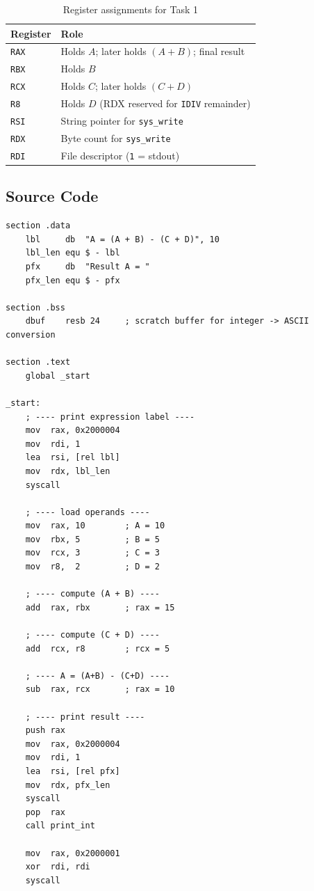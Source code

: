 \documentclass[12pt,a4paper]{article}
\newcommand{\code}[1]{\texttt{\small #1}}
\begin{document}
\begin{table}[H]
  \centering
  \caption{Register assignments for Task 1}
  \renewcommand{\arraystretch}{1.3}
  \begin{tabular}{|l|l|}
    \hline
    \textbf{Register} & \textbf{Role} \\
    \hline
    \code{RAX} & Holds $A$; later holds $(A+B)$; final result \\
    \code{RBX} & Holds $B$ \\
    \code{RCX} & Holds $C$; later holds $(C+D)$ \\
    \code{R8}  & Holds $D$ (RDX reserved for \code{IDIV} remainder) \\
    \code{RSI} & String pointer for \code{sys\_write} \\
    \code{RDX} & Byte count for \code{sys\_write} \\
    \code{RDI} & File descriptor (\texttt{1} = stdout) \\
    \hline
  \end{tabular}
\end{table}

\subsection{Source Code}

\begin{lstlisting}[caption={task1.asm --- compute A = (A + B) - (C + D)}]
section .data
    lbl     db  "A = (A + B) - (C + D)", 10
    lbl_len equ $ - lbl
    pfx     db  "Result A = "
    pfx_len equ $ - pfx

section .bss
    dbuf    resb 24     ; scratch buffer for integer -> ASCII conversion

section .text
    global _start

_start:
    ; ---- print expression label ----
    mov  rax, 0x2000004
    mov  rdi, 1
    lea  rsi, [rel lbl]
    mov  rdx, lbl_len
    syscall

    ; ---- load operands ----
    mov  rax, 10        ; A = 10
    mov  rbx, 5         ; B = 5
    mov  rcx, 3         ; C = 3
    mov  r8,  2         ; D = 2

    ; ---- compute (A + B) ----
    add  rax, rbx       ; rax = 15

    ; ---- compute (C + D) ----
    add  rcx, r8        ; rcx = 5

    ; ---- A = (A+B) - (C+D) ----
    sub  rax, rcx       ; rax = 10

    ; ---- print result ----
    push rax
    mov  rax, 0x2000004
    mov  rdi, 1
    lea  rsi, [rel pfx]
    mov  rdx, pfx_len
    syscall
    pop  rax
    call print_int

    mov  rax, 0x2000001
    xor  rdi, rdi
    syscall
\end{lstlisting}
\end{document}
